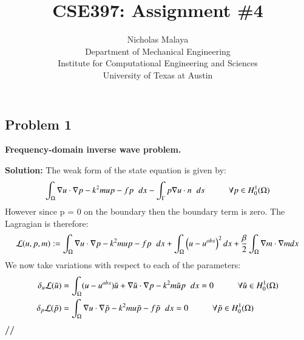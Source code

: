 \documentclass[11pt]{article}
\newenvironment{solution}{\begin{trivlist}\item[]{\bf Solution:}}
                      {\textbf{//} \end{trivlist}}
\begin{document}
\title{\bf{CSE397: Assignment \#4}}
\author{Nicholas Malaya \\ Department of Mechanical Engineering \\
Institute for Computational Engineering and Sciences \\ University of
Texas at Austin} \date{} 
\maketitle
\newpage

\subsection*{ Problem 1}
\textbf{Frequency-domain inverse wave problem.} 

\begin{enumerate}
\item[(a)]
\begin{solution}
The weak form of the state equation is given by: 
\begin{displaymath}
\int_{\Omega}\nabla u \cdot \nabla p - k^2mup - fp\hspace{2 mm}dx -
 \int_{\Gamma}p\nabla u \cdot n\hspace{2 mm}ds \hspace{1 cm} \forall p
 \in H^1_0(\Omega) 
\end{displaymath}
However since p = 0 on the boundary then the boundary term is zero. The
 Lagragian is therefore:  
\begin{displaymath}
\mathcal{L}(u,p,m) := \int_{\Omega}\nabla u \cdot \nabla p - k^2mup -
 fp\hspace{2 mm}dx + \int_{\Omega}\left(u - u^{obs}\right)^2 dx +
 \frac{\beta}{2}\int_{\Omega}\nabla m \cdot \nabla m dx 
\end{displaymath}
We now take variations with respect to each of the parameters:
\begin{align}
\delta_u\mathcal{L}(\tilde{u}) &= \int_{\Omega}(u-u^{obs})\tilde{u} +
 \nabla\tilde{u}\cdot\nabla p - k^2m\tilde{u}p \hspace{2 mm} dx = 0
 \hspace{1 cm} \forall\tilde{u} \in H^1_0(\Omega) \nonumber \\ 
\delta_p\mathcal{L}(\tilde{p}) &= \int_{\Omega} \nabla u \cdot
 \nabla\tilde{p} - k^2mu\tilde{p} - f\tilde{p} \hspace{2 mm} dx = 0
 \hspace{1 cm} \forall\tilde{p} \in H^1_0(\Omega) \nonumber \\ 

\end{align}
\end{solution}
\end{enumerate}
\end{document}
